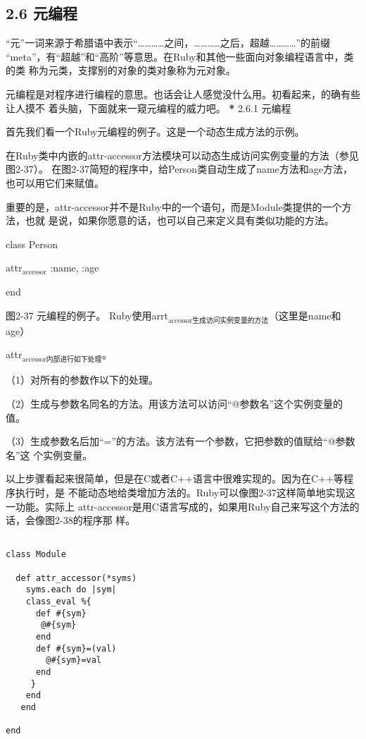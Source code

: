 \documentclass[11pt]{ctexart}
\begin{document}
\subsection{2.6 元编程}
\label{sec:orgefddfb8}

“元”一词来源于希腊语中表示“…………之间，…………之后，超越…………”的前缀
“meta”，有“超越”和“高阶”等意思。在Ruby和其他一些面向对象编程语言中，类的类
称为元类，支撑别的对象的类对象称为元对象。

元编程是对程序进行编程的意思。也话会让人感觉没什么用。初看起来，的确有些让人摸不
着头脑，下面就来一窥元编程的威力吧。
 \textbf{*} 2.6.1 元编程 

首先我们看一个Ruby元编程的例子。这是一个动态生成方法的示例。

在Ruby类中内嵌的attr-accessor方法模块可以动态生成访问实例变量的方法（参见图2-37）。
在图2-37简短的程序中，给Person类自动生成了name方法和age方法，也可以用它们来赋值。

重要的是，attr-accessor并不是Ruby中的一个语句，而是Module类提供的一个方法，也就
是说，如果你愿意的话，也可以自己来定义具有类似功能的方法。

class Person

attr\(_{\text{accessor}}\) :name, :age

end

图2-37 元编程的例子。 Ruby使用arrt\(_{\text{accessor生成访问实例变量的方法}}\)（这里是name和
age）

attr\(_{\text{accessor内部进行如下处理}}\)。

（1）对所有的参数作以下的处理。

（2）生成与参数名同名的方法。用该方法可以访问“@参数名”这个实例变量的值。

（3）生成参数名后加“=”的方法。该方法有一个参数，它把参数的值赋给“@参数名”这
个实例变量。

以上步骤看起来很简单，但是在C或者C++语言中很难实现的。因为在C++等程序执行时，是
不能动态地给类增加方法的。Ruby可以像图2-37这样简单地实现这一功能。实际上
attr-accessor是用C语言写成的，如果用Ruby自己来写这个方法的话，会像图2-38的程序那
样。

\lstset{language=org,label= ,caption= ,captionpos=b,numbers=none}
\begin{lstlisting}

class Module

  def attr_accessor(*syms)
    syms.each do |sym|
    class_eval %{
      def #{sym}
       @#{sym}
      end
      def #{sym}=(val)
        @#{sym}=val
      end
     }
    end
   end

end

\end{lstlisting}
\end{document}
